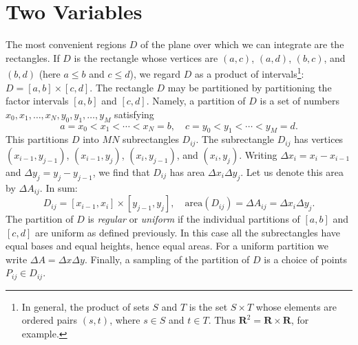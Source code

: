 \documentclass[12pt]{amsart}
\begin{document}
\newcommand{\R}{\mathbf{R}}

\section{Two Variables}
The most convenient regions $D$ of the plane over which we can integrate are the rectangles. If $D$ is the rectangle whose vertices are $(a,c)$, $(a,d)$, $(b,c)$, and $(b,d)$ (here $a \leq b$ and $c \leq d$), we regard $D$ as a product of intervals\footnote{In general, the product of sets $S$ and $T$ is the set $S \times T$ whose elements are ordered pairs $(s,t)$, where $s \in S$ and $t \in T$. Thus $\R^2 = \R \times \R$, for example.}: $D = [a,b] \times [c,d]$. The rectangle $D$ may be partitioned by partitioning the factor intervals $[a,b]$ and $[c,d]$. Namely, a partition of $D$ is a set of numbers $x_0, x_1, \ldots, x_N, y_0, y_1, \ldots, y_M$ satisfying
\[
a = x_0 < x_1 < \cdots < x_N = b, \quad c = y_0 < y_1 < \cdots < y_M = d.
\]
This partitions $D$ into $MN$ subrectangles $D_{ij}$. The subrectangle $D_{ij}$ has vertices $(x_{i-1},y_{j-1})$, $(x_{i-1},y_j)$, $(x_{i},y_{j-1})$, and $(x_i,y_j)$. Writing $\Delta x_i = x_i - x_{i-1}$ and $\Delta y_j = y_j - y_{j-1}$, we find that $D_{ij}$ has area $\Delta x_i \Delta y_j$. Let us denote this area by $\Delta A_{ij}$. In sum:
\[
D_{ij} = [x_{i-1},x_i] \times [y_{j-1}, y_j], \quad \mathrm{area}(D_{ij}) = \Delta A_{ij} = \Delta x_i \Delta y_j.
\]
The partition of $D$ is \emph{regular} or \emph{uniform} if the individual partitions of $[a,b]$ and $[c,d]$ are uniform as defined previously. In this case all the subrectangles have equal bases and equal heights, hence equal areas. For a uniform partition we write $\Delta A = \Delta x \Delta y$. Finally, a sampling of the partition of $D$ is a choice of points $P_{ij} \in D_{ij}$.
\end{document}
